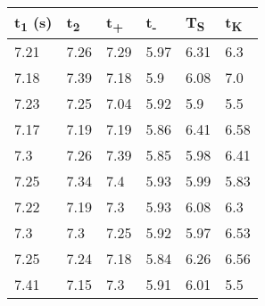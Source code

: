 \documentclass[titlepage=firstcover, captions=tableheading]{scrartcl}
\begin{document}
\begin{minipage}{\linewidth}
    \centering
{}
\begin{tabular}{llllll}
    \toprule
    t\textsubscript{1} (s) & t\textsubscript{2} & t\textsubscript{+} & t\textsubscript{-} & T\textsubscript{S} & t\textsubscript{K}\\
    \midrule
    7.21 & 	7.26 & 7.29  & 5.97 & 6.31 & 6.3  \\
    7.18 & 	7.39 & 7.18  & 5.9 &  6.08 & 7.0 \\
    7.23 & 	7.25 & 7.04  & 5.92 & 5.9  & 5.5 \\
    7.17 & 	7.19 & 7.19  & 5.86 & 6.41 & 6.58  \\
    7.3  &  7.26 & 7.39  & 5.85 & 5.98 & 6.41  \\
    7.25 & 	7.34 & 7.4  &  5.93 & 5.99 & 5.83 \\
    7.22 & 	7.19 & 7.3  &  5.93 & 6.08 & 6.3 \\
    7.3  &  7.3  & 7.25  & 5.92 & 5.97 & 6.53  \\
    7.25 & 	7.24 & 7.18  & 5.84 & 6.26 & 6.56  \\
    7.41 & 	7.15 & 7.3  &  5.91 & 6.01 & 5.5 \\
    \bottomrule
    
\end{tabular}
\end{minipage}
\end{document}
